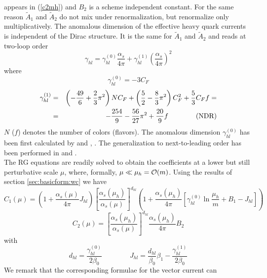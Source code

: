 appears in (\ref{c2mh}) and $B_2$ is a scheme independent constant.
For the same reason $\tilde A_1$ and $\tilde A_2$ do not mix under
renormalization, but renormalize only multiplicatively.
The anomalous dimension of the effective heavy quark currents is independent
of the Dirac structure. It is the same for $\tilde A_1$ and $\tilde A_2$
and reads at two-loop order
\begin{equation}\label{g01h}
\gamma_{hl}=\gamma^{(0)}_{hl}\frac{\alpha_s}{4\pi}+\gamma^{(1)}_{hl}
\left(\frac{\alpha_s}{4\pi}\right)^2
\end{equation}
where
\begin{equation}\label{g0hl}
\gamma^{(0)}_{hl}=-3 C_F
\end{equation}
\begin{eqnarray}\label{g1hl}
\gamma^{(1)}_{hl} &=& \left(-\frac{49}{6}+\frac{2}{3}\pi^2\right)N C_F+
 \left(\frac{5}{2}-\frac{8}{3}\pi^2\right) C^2_F+\frac{5}{3}C_F f=
 \nonumber\\
&=& -\frac{254}{9}-\frac{56}{27}\pi^2+\frac{20}{9}f\qquad\qquad {\rm (NDR)}
\end{eqnarray}
$N$ ($f$) denotes the number of colors (flavors). The anomalous
dimension $\gamma^{(0)}_{hl}$ has been first calculated by
\cite{voloshinshifman:87} and \cite{politzerwise:88a},
\cite{politzerwise:88b}. The generalization to next-to-leading order
has been performed in \cite{jimuslof:91} and
\cite{broadhurstgrozin:91}.
\\
The RG equations are readily solved to obtain the coefficients at a lower
but still perturbative scale $\mu$, where, formally,
$\mu\ll\mu_h={\cal O}(m)$. Using the results of section
\ref{sec:basicform:wc} we have
\begin{equation}\label{c1hl}
C_1(\mu)=\left(1+\frac{\alpha_s(\mu)}{4\pi}J_{hl}\right)
\left[\frac{\alpha_s(\mu_h)}{\alpha_s(\mu)}\right]^
{d_{hl}}\left(1+\frac{\alpha_s(\mu_h)}{4\pi}
\left[\gamma^{(0)}_{hl}\ln\frac{\mu_h}{m}+B_1-J_{hl}\right]\right)
\end{equation}
\begin{equation}\label{c2hl}
C_2(\mu)=\left[\frac{\alpha_s(\mu_h)}{\alpha_s(\mu)}\right]^
{d_{hl}}\frac{\alpha_s(\mu_h)}{4\pi}B_2
\end{equation}
with
\begin{equation}\label{djhl}
d_{hl}=\frac{\gamma^{(0)}_{hl}}{2\beta_0}\qquad\qquad
J_{hl}=\frac{d_{hl}}{\beta_0}\beta_1-\frac{\gamma^{(1)}_{hl}}{2\beta_0}
\end{equation}
We remark that the corresponding formulae for the vector current can
